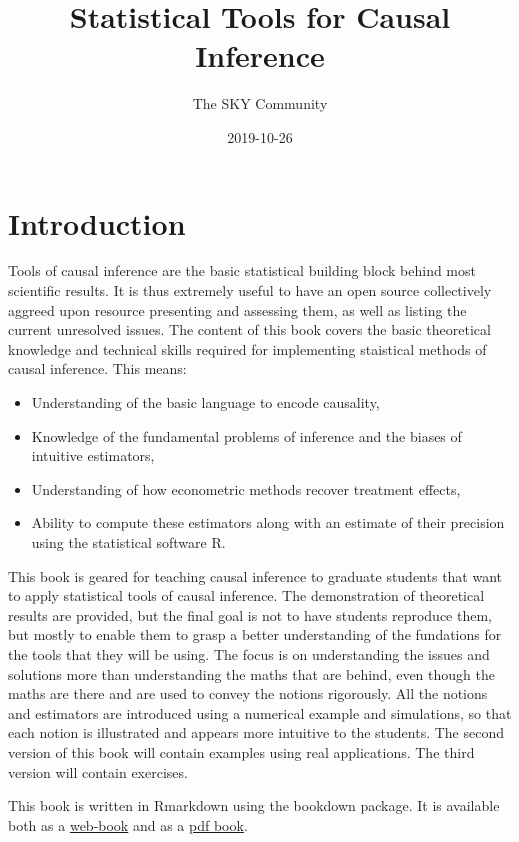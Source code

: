 \documentclass[]{book}
\title{Statistical Tools for Causal Inference}
\author{The SKY Community}
\date{2019-10-26}
\providecommand{\tightlist}{%
  \setlength{\itemsep}{0pt}\setlength{\parskip}{0pt}}
\theoremstyle{definition}
\theoremstyle{definition}
\theoremstyle{definition}
\theoremstyle{remark}
\begin{document}
\maketitle

{
\setcounter{tocdepth}{0}
\tableofcontents
}
\chapter*{Introduction}\label{introduction}

Tools of causal inference are the basic statistical building block
behind most scientific results. It is thus extremely useful to have an
open source collectively aggreed upon resource presenting and assessing
them, as well as listing the current unresolved issues. The content of
this book covers the basic theoretical knowledge and technical skills
required for implementing staistical methods of causal inference. This
means:

\begin{itemize}
\tightlist
\item
  Understanding of the basic language to encode causality,
\item
  Knowledge of the fundamental problems of inference and the biases of
  intuitive estimators,
\item
  Understanding of how econometric methods recover treatment effects,
\item
  Ability to compute these estimators along with an estimate of their
  precision using the statistical software R.
\end{itemize}

This book is geared for teaching causal inference to graduate students
that want to apply statistical tools of causal inference. The
demonstration of theoretical results are provided, but the final goal is
not to have students reproduce them, but mostly to enable them to grasp
a better understanding of the fundations for the tools that they will be
using. The focus is on understanding the issues and solutions more than
understanding the maths that are behind, even though the maths are there
and are used to convey the notions rigorously. All the notions and
estimators are introduced using a numerical example and simulations, so
that each notion is illustrated and appears more intuitive to the
students. The second version of this book will contain examples using
real applications. The third version will contain exercises.

This book is written in Rmarkdown using the bookdown package. It is
available both as a \href{https://chabefer.github.io/STCI/}{web-book}
and as a \href{https://chabefer.github.io/STCI/STCI.pdf}{pdf book}.
\end{document}
